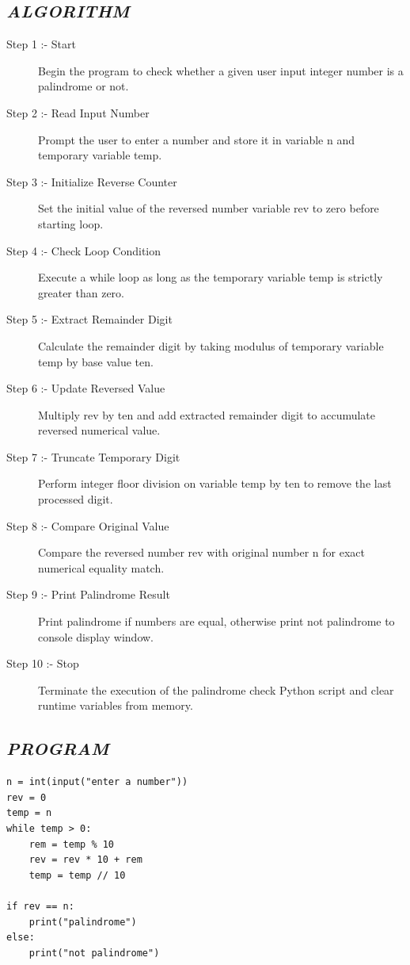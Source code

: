 \documentclass[11pt,a4paper]{article}
\begin{document}
\subsection*{\textit{ALGORITHM}}
\begin{description}
  \item[Step 1 :- Start] Begin the program to check whether a given user input integer number is a palindrome or not.
  \item[Step 2 :- Read Input Number] Prompt the user to enter a number and store it in variable n and temporary variable temp.
  \item[Step 3 :- Initialize Reverse Counter] Set the initial value of the reversed number variable rev to zero before starting loop.
  \item[Step 4 :- Check Loop Condition] Execute a while loop as long as the temporary variable temp is strictly greater than zero.
  \item[Step 5 :- Extract Remainder Digit] Calculate the remainder digit by taking modulus of temporary variable temp by base value ten.
  \item[Step 6 :- Update Reversed Value] Multiply rev by ten and add extracted remainder digit to accumulate reversed numerical value.
  \item[Step 7 :- Truncate Temporary Digit] Perform integer floor division on variable temp by ten to remove the last processed digit.
  \item[Step 8 :- Compare Original Value] Compare the reversed number rev with original number n for exact numerical equality match.
  \item[Step 9 :- Print Palindrome Result] Print palindrome if numbers are equal, otherwise print not palindrome to console display window.
  \item[Step 10 :- Stop] Terminate the execution of the palindrome check Python script and clear runtime variables from memory.
\end{description}

\subsection*{\textit{PROGRAM}}
\begin{lstlisting}[style=pythonstyle]
n = int(input("enter a number")) 
rev = 0 
temp = n 
while temp > 0: 
    rem = temp % 10 
    rev = rev * 10 + rem 
    temp = temp // 10 

if rev == n: 
    print("palindrome") 
else: 
    print("not palindrome")
\end{lstlisting}
\end{document}
